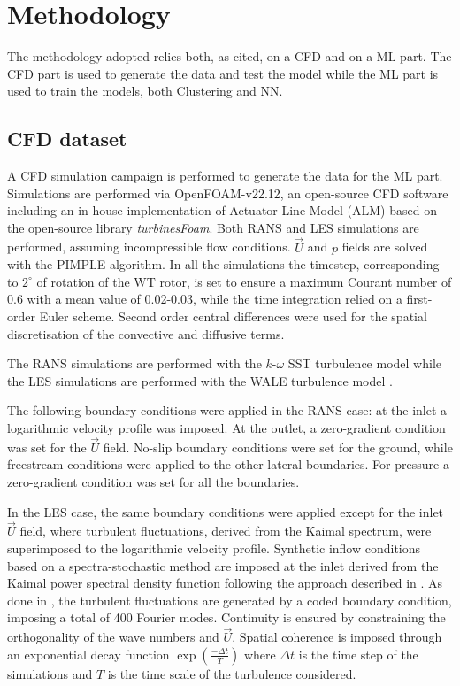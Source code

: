 \section{Methodology}
\label{sec:methodology}
The methodology adopted relies both, as cited, on a CFD and on a ML part. The CFD part is used to generate the data and test the model while the ML part is used to train the models, both Clustering and NN.

\subsection{CFD dataset}

A CFD simulation campaign is performed to generate the data for the ML part.
Simulations are performed via OpenFOAM-v22.12, an open-source CFD software including an in-house implementation of Actuator Line Model (ALM)\cite{10.1115/1.1471361} based on the open-source library \textit{turbinesFoam}\cite{turbinesFoam}. Both RANS and LES simulations are performed, assuming incompressible flow conditions.
$\vec{U}$ and $p$ fields are solved with the PIMPLE algorithm.
In all the simulations the timestep, corresponding to $2^\circ$ of rotation of the WT rotor, is set to ensure a maximum Courant number of 0.6 with a mean value of 0.02-0.03, while the time integration relied on a first-order Euler scheme. Second order central differences were used for the spatial discretisation of the convective and diffusive terms.

The RANS simulations are performed with the $k$-$\omega$ SST turbulence model \cite{doi:10.2514/3.12149} while the LES simulations are performed with the WALE turbulence model \cite{WALE}.

The following boundary conditions were applied in the RANS case: at the inlet a logarithmic velocity profile was imposed. At the outlet, a zero-gradient condition was set
for the $\vec{U}$ field. No-slip boundary conditions were set for the ground, while freestream conditions were applied to the other lateral boundaries. For pressure a zero-gradient condition was set for all the boundaries.

In the LES case, the same boundary conditions were applied except for the inlet $\vec{U}$ field, where turbulent fluctuations, derived from the Kaimal spectrum, were superimposed to the logarithmic velocity profile. Synthetic inflow conditions based on a spectra-stochastic method are imposed at the inlet derived from the Kaimal power spectral density function \cite{kaimal} following the approach described in \cite{Davidson2007UsingIS}. As done in \cite{Carloni2026}, the turbulent fluctuations are generated by a coded boundary condition, imposing a total of 400 Fourier modes. Continuity is ensured by constraining the orthogonality of the wave numbers and $\vec{U}$. Spatial coherence is imposed through an exponential decay function $\exp(\frac{-\Delta t}{T})$ where $\Delta t$ is the time step of the simulations and $T$ is the time scale of the turbulence considered.

